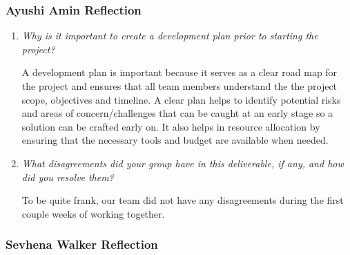 \documentclass{article}
\begin{document}
\subsubsection*{Ayushi Amin Reflection}

\begin{enumerate}
  \item \textit{Why is it important to create a development plan prior to starting the
    project?}
    
    A development plan is important because it serves as a clear road map for the project and ensures that all 
    team members understand the the project scope, objectives and timeline. A clear plan helps to identify potential risks
    and areas of concern/challenges that can be caught at an early stage so a solution can be crafted early on. It also helps
    in resource allocation by ensuring that the necessary tools and budget are available when needed.

  \item \textit{What disagreements did your group have in this deliverable, if any, and how did you resolve them?}

    To be quite frank, our team did not have any disagreements during the first couple weeks of working together.

\end{enumerate}

\subsubsection*{Sevhena Walker Reflection}
\end{document}
